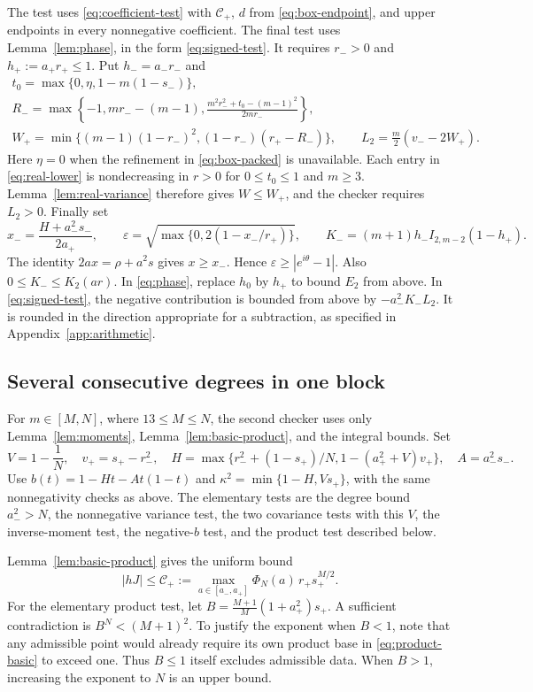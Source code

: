\documentclass[11pt,reqno]{amsart}
\theoremstyle{definition}
\theoremstyle{remark}
\numberwithin{equation}{section}
\newcommand{\file}[1]{\texttt{\detokenize{#1}}}
\begin{document}
The test \file{center_coeff} uses \eqref{eq:coefficient-test} with $\mathcal C_+$, $d$ from \eqref{eq:box-endpoint}, and upper endpoints in every nonnegative coefficient. The final test \file{center_positive} uses Lemma~\ref{lem:phase}, in the form \eqref{eq:signed-test}. It requires $r_->0$ and $h_+:=a_+r_+\le1$. Put $h_-=a_-r_-$ and
\[
 \begin{gathered}
 t_0=\max\{0,\eta,1-m(1-s_-)\},\\
 R_- =\max\left\{-1,mr_--(m-1),
       \frac{m^2r_-^2+t_0-(m-1)^2}{2mr_-}\right\},\\
 W_+=\min\{(m-1)(1-r_-)^2,(1-r_-)(r_+-R_-)\},\qquad
 L_2=\frac m2(v_--2W_+).
 \end{gathered}
\]
Here $\eta=0$ when the refinement in \eqref{eq:box-packed} is unavailable. Each entry in \eqref{eq:real-lower} is nondecreasing in $r>0$ for $0\le t_0\le1$ and $m\ge3$. Lemma~\ref{lem:real-variance} therefore gives $W\le W_+$, and the checker requires $L_2>0$.
Finally set
\[
 x_- =\frac{H+a_-^2s_-}{2a_+},\qquad
 \varepsilon=\sqrt{\max\{0,2(1-x_-/r_+)\}},\qquad
 K_-=(m+1)h_-I_{2,m-2}(1-h_+).
\]
The identity $2ax=\rho+a^2s$ gives $x\ge x_-$. Hence $\varepsilon\ge|e^{i\theta}-1|$. Also $0\le K_-\le K_2(ar)$. In \eqref{eq:phase}, replace $h_0$ by $h_+$ to bound $E_2$ from above. In \eqref{eq:signed-test}, the negative contribution is bounded from above by $-a_-^2K_-L_2$. It is rounded in the direction appropriate for a subtraction, as specified in Appendix~\ref{app:arithmetic}.

\subsection{Several consecutive degrees in one block}\label{app:mid}

For $m\in[M,N]$, where $13\le M\le N$, the second checker uses only Lemma~\ref{lem:moments}, Lemma~\ref{lem:basic-product}, and the integral bounds. Set
\[
 V=1-\frac1N,\quad v_+=s_+-r_-^2,\quad
 H=\max\{r_-^2+(1-s_+)/N,1-(a_+^2+V)v_+\},\quad
 A=a_-^2s_-.
\]
Use $b(t)=1-Ht-At(1-t)$ and $\kappa^2=\min\{1-H,Vs_+\}$, with the same nonnegativity checks as above. The elementary tests are the degree bound $a_-^2>N$, the nonnegative variance test, the two covariance tests with this $V$, the inverse-moment test, the negative-$b$ test, and the product test described below.

Lemma~\ref{lem:basic-product} gives the uniform bound
\[
 |hJ|\le \mathcal C_+:=\max_{a\in[a_-,a_+]}\Phi_N(a)\,r_+s_+^{M/2}.
\]
For the elementary product test, let
$B=\frac{M+1}{M}(1+a_+^2)s_+$. A sufficient contradiction is $B^N<(M+1)^2$. To justify the exponent when $B<1$, note that any admissible point would already require its own product base in \eqref{eq:product-basic} to exceed one. Thus $B\le1$ itself excludes admissible data. When $B>1$, increasing the exponent to $N$ is an upper bound.
\end{document}
